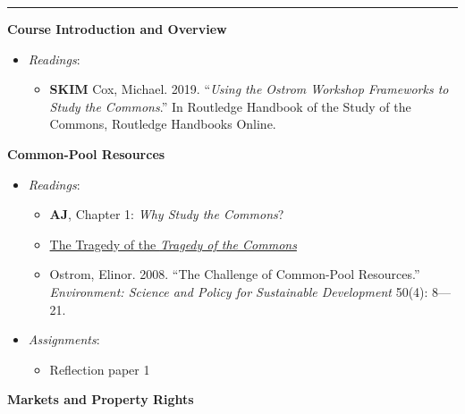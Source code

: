 \begin{center}\rule{0.5\linewidth}{0.5pt}\end{center}

\SetDate[16/08/2021]

\week \textbf{Course Introduction and Overview}

\begin{itemize}

\item
  \emph{Readings}:

  \begin{itemize}
  
  \item
    \textbf{SKIM} Cox, Michael. 2019. ``\emph{Using the Ostrom Workshop
    Frameworks to Study the Commons}.'' In Routledge Handbook of the
    Study of the Commons, Routledge Handbooks Online.
  \end{itemize}
\end{itemize}

\week \textbf{Common-Pool Resources}

\begin{itemize}

\item
  \emph{Readings}:

  \begin{itemize}
  
  \item
    \textbf{AJ}, Chapter 1: \emph{Why Study the Commons}?
  \item
    \href{https://blogs.scientificamerican.com/voices/the-tragedy-of-the-tragedy-of-the-commons/}{The
    Tragedy of the \emph{Tragedy of the Commons}}
  \item
    Ostrom, Elinor. 2008. ``The Challenge of Common-Pool Resources.''
    \emph{Environment: Science and Policy for Sustainable Development}
    50(4): 8---21.
  \end{itemize}
\item
  \emph{Assignments}:

  \begin{itemize}
  
  \item
    Reflection paper 1
  \end{itemize}
\end{itemize}

\week \textbf{Markets and Property Rights}

